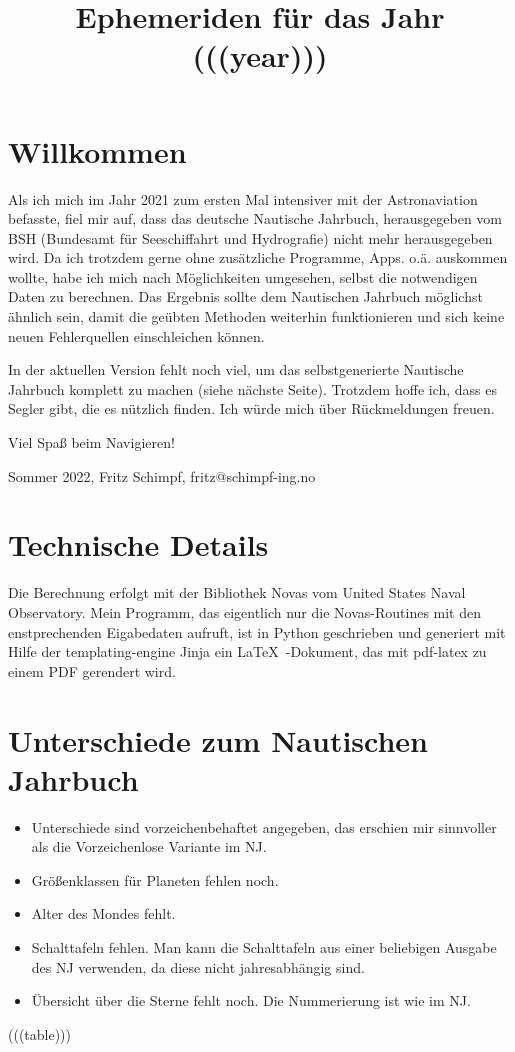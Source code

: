 \documentclass[a4paper, twoside]{book}
\title{Ephemeriden für das Jahr (((year)))}
\date{}
\begin{document}
\sffamily
\maketitle
\section{Willkommen}
Als ich mich im Jahr 2021 zum ersten Mal intensiver mit der Astronaviation befasste, fiel mir auf, dass das deutsche Nautische Jahrbuch, herausgegeben vom BSH (Bundesamt für Seeschiffahrt und Hydrografie) nicht mehr herausgegeben wird. Da ich trotzdem gerne ohne zusätzliche Programme, Apps. o.ä. auskommen wollte, habe ich mich nach Möglichkeiten umgesehen, selbst die notwendigen Daten zu berechnen. Das Ergebnis sollte dem Nautischen Jahrbuch möglichst ähnlich sein, damit die geübten Methoden weiterhin funktionieren und sich keine neuen Fehlerquellen einschleichen können.

\vspace{1cm}
In der aktuellen Version fehlt noch viel, um das selbstgenerierte Nautische Jahrbuch komplett zu machen (siehe nächste Seite). Trotzdem hoffe ich, dass es Segler gibt, die es nützlich finden. Ich würde mich über Rückmeldungen freuen.

\vspace{1cm}
\begin{center}
Viel Spaß beim Navigieren!

\vspace{1cm}
Sommer 2022, Fritz Schimpf, fritz@schimpf-ing.no
\end{center} 

\vspace{1cm}



\section{Technische Details}
Die Berechnung erfolgt mit der Bibliothek Novas vom United States Naval Observatory. Mein Programm, das eigentlich nur die Novas-Routines mit den enstprechenden Eigabedaten aufruft, ist in Python geschrieben und generiert mit Hilfe der templating-engine Jinja ein \LaTeX\ -Dokument, das mit pdf-latex zu einem PDF gerendert wird.

\newpage

\section{Unterschiede zum Nautischen Jahrbuch}
\begin{itemize}
\item Unterschiede sind vorzeichenbehaftet angegeben, das erschien mir sinnvoller als die Vorzeichenlose Variante im NJ.
\item Größenklassen für Planeten fehlen noch.
\item Alter des Mondes fehlt.
\item Schalttafeln fehlen. Man kann die Schalttafeln aus einer beliebigen Ausgabe des NJ verwenden, da diese nicht jahresabhängig sind.
\item Übersicht über die Sterne fehlt noch. Die Nummerierung ist wie im NJ.
\end{itemize}

\newpage

(((table)))
\end{document}
